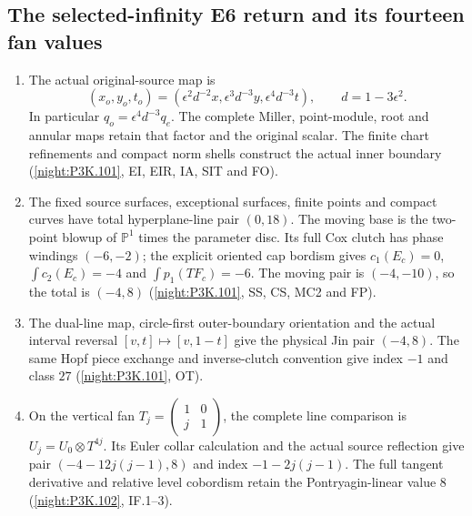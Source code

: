 \subsection{The selected-infinity E6 return and its fourteen fan values}
\RungOne
\begin{enumerate}[label=\arabic*.]
\item The actual original-source map is
  \[
  (x_o,y_o,t_o)=
  (\epsilon^2d^{-2}x,\epsilon^3d^{-3}y,\epsilon^4d^{-3}t),
  \qquad d=1-3\epsilon^2.
  \]
  In particular $q_o=\epsilon^4d^{-3}q_e$. The complete Miller,
  point-module, root and annular maps retain that factor and the
  original scalar. The finite chart refinements and compact norm
  shells construct the actual inner boundary
  (\cref{night:P3K.101}, EI, EIR, IA, SIT and FO).
\item The fixed source surfaces, exceptional surfaces, finite
  points and compact curves have total hyperplane-line pair
  $(0,18)$. The moving base is the two-point blowup of
  $\mathbb P^1$ times the parameter disc. Its full Cox clutch has
  phase windings $(-6,-2)$; the explicit oriented cap bordism gives
  $c_1(E_c)=0$, $\int c_2(E_c)=-4$ and $\int p_1(TF_c)=-6$.
  The moving pair is $(-4,-10)$, so the total is $(-4,8)$
  (\cref{night:P3K.101}, SS, CS, MC2 and FP).
\item The dual-line map, circle-first outer-boundary orientation
  and the actual interval reversal $[v,t]\mapsto[v,1-t]$
  give the physical Jin pair $(-4,8)$. The same Hopf
  piece exchange and inverse-clutch convention give index $-1$
  and class $27$ (\cref{night:P3K.101}, OT).
\item On the vertical fan
  $T_j=\left(\begin{smallmatrix}1&0\\j&1\end{smallmatrix}\right)$,
  the complete line comparison is $U_j=U_0\otimes T^{4j}$.
  Its Euler collar calculation and the actual source reflection
  give pair $(-4-12j(j-1),8)$ and index $-1-2j(j-1)$.
  The full tangent derivative and relative level cobordism
  retain the Pontryagin-linear value $8$
  (\cref{night:P3K.102}, IF.1--3).

\end{enumerate}
